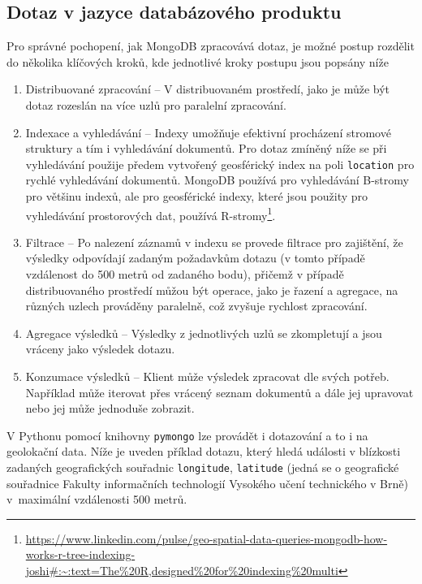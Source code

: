 \documentclass[a4paper, 11pt]{article}
\begin{document}
    \subsection{Dotaz v jazyce databázového produktu}
    Pro správné pochopení, jak MongoDB zpracovává dotaz, je možné postup rozdělit do několika klíčových kroků, kde jednotlivé kroky postupu jsou popsány níže
    \begin{enumerate}
        \item Distribuované zpracování -- V distribuovaném prostředí, jako je může být dotaz rozeslán na více uzlů pro paralelní zpracování.
        \item Indexace a vyhledávání --  Indexy umožňuje efektivní procházení stromové struktury a tím i vyhledávání dokumentů. Pro dotaz zmíněný níže se při vyhledávání použije předem vytvořený geosférický index na poli \texttt{location} pro rychlé vyhledávání dokumentů. MongoDB používá pro vyhledávání B-stromy pro většinu indexů, ale pro geosférické indexy, které jsou použity pro vyhledávání prostorových dat, používá R-stromy\footnote{\url{https://www.linkedin.com/pulse/geo-spatial-data-queries-mongodb-how-works-r-tree-indexing-joshi\#:\~:text=The\%20R,designed\%20for\%20indexing\%20multi}}.
        \item Filtrace -- Po nalezení záznamů v indexu se provede filtrace pro zajištění, že výsledky odpovídají zadaným požadavkům dotazu (v tomto případě vzdálenost do 500 metrů od zadaného bodu), přičemž v případě distribuovaného prostředí můžou být operace, jako je řazení a agregace, na různých uzlech prováděny paralelně, což zvyšuje rychlost zpracování.
        \item Agregace výsledků -- Výsledky z jednotlivých uzlů se zkompletují a jsou vráceny jako výsledek dotazu.
        \item Konzumace výsledků -- Klient může výsledek zpracovat dle svých potřeb. Například může iterovat přes vrácený seznam dokumentů a dále jej upravovat nebo jej může jednoduše zobrazit.
    \end{enumerate}
    \newpage
    V Pythonu pomocí knihovny \texttt{pymongo} lze provádět i dotazování a to i na geolokační data. Níže je uveden příklad dotazu, který hledá události v blízkosti zadaných geografických souřadnic \texttt{longitude}, \texttt{latitude} (jedná se o geografické souřadnice Fakulty informačních technologií Vysokého učení technického v Brně) v~maximální vzdálenosti 500 metrů.
    
\end{document}
